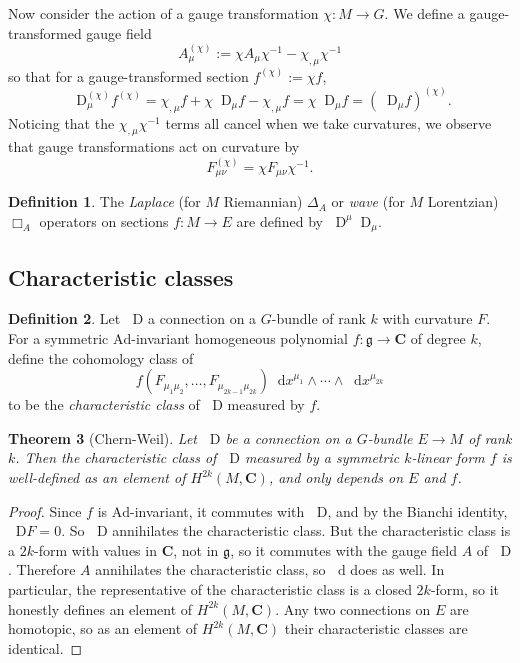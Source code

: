 \documentclass[reqno,11pt]{amsart}
\newcommand{\CC}{\mathbf{C}}
\newcommand*\dif{\mathop{}\!\mathrm{d}}
\newcommand*\Dif{\mathop{}\!\mathrm{D}}
\newcommand{\dfn}[1]{\emph{#1}\index{#1}}
\newcommand{\Ad}{\mathrm{Ad}}
\newtheorem{theorem}{Theorem}[section]
\theoremstyle{definition}
\newtheorem{definition}[theorem]{Definition}
\numberwithin{equation}{section}
\begin{document}
Now consider the action of a gauge transformation $\chi: M \to G$.
We define a gauge-transformed gauge field
$$A_\mu^{(\chi)} := \chi A_\mu \chi^{-1} - \chi_{,\mu} \chi^{-1}$$
so that for a gauge-transformed section $f^{(\chi)} := \chi f$,
$$\Dif^{(\chi)}_\mu f^{(\chi)} = \chi_{,\mu} f + \chi \Dif_\mu f - \chi_{,\mu} f = \chi \Dif_\mu f = (\Dif_\mu f)^{(\chi)}.$$
Noticing that the $\chi_{,\mu} \chi^{-1}$ terms all cancel when we take curvatures, we observe that gauge transformations act on curvature by
\begin{equation}\label{curvature transformation}
F_{\mu \nu}^{(\chi)} = \chi F_{\mu \nu} \chi^{-1}.
\end{equation}

\begin{definition}
The \dfn{Laplace} (for $M$ Riemannian) $\Delta_A$ or \dfn{wave} (for $M$ Lorentzian) $\Box_A$ operators on sections $f: M \to E$ are defined by $\Dif^\mu \Dif_\mu$.
\end{definition}

\subsection{Characteristic classes}
\begin{definition}
Let $\Dif$ a connection on a $G$-bundle of rank $k$ with curvature $F$.
For a symmetric $\Ad$-invariant homogeneous polynomial $f: \mathfrak g \to \CC$ of degree $k$, define the cohomology class of
$$f(F_{\mu_1 \mu_2}, \dots, F_{\mu_{2k - 1} \mu_{2k}}) \dif x^{\mu_1} \wedge \cdots \wedge \dif x^{\mu_{2k}}$$
to be the \dfn{characteristic class} of $\Dif$ measured by $f$.
\end{definition}

\begin{theorem}[Chern-Weil]
Let $\Dif$ be a connection on a $G$-bundle $E \to M$ of rank $k$.
Then the characteristic class of $\Dif$ measured by a symmetric $k$-linear form $f$ is well-defined as an element of $H^{2k}(M, \CC)$, and only depends on $E$ and $f$.
\end{theorem}
\begin{proof}
Since $f$ is $\Ad$-invariant, it commutes with $\Dif$, and by the Bianchi identity, $\Dif F = 0$.
So $\Dif$ annihilates the characteristic class.
But the characteristic class is a $2k$-form with values in $\CC$, not in $\mathfrak g$, so it commutes with the gauge field $A$ of $\Dif$.
Therefore $A$ annihilates the characteristic class, so $\dif$ does as well.
In particular, the representative of the characteristic class is a closed $2k$-form, so it honestly defines an element of $H^{2k}(M, \CC)$.
Any two connections on $E$ are homotopic, so as an element of $H^{2k}(M, \CC)$ their characteristic classes are identical.
\end{proof}
\end{document}
